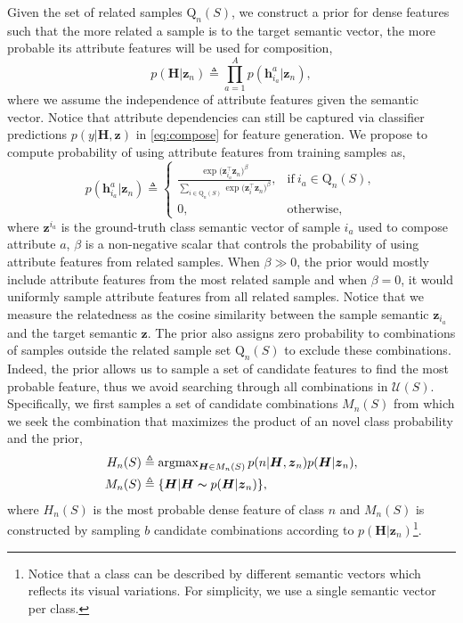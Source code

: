 \documentclass[10pt,journal,compsoc]{IEEEtran}
\newcommand{\z}{\boldsymbol{z}}
\newcommand{\h}{\boldsymbol{h}}
\renewcommand{\H}{\boldsymbol{H}}
\newcommand{\1}{\boldsymbol{1}}
\newcommand{\0}{\boldsymbol{0}}
\newcommand{\U}{\mathcal{U}}
\newcommand{\Q}{\mathrm{Q}}
\newcommand{\argmax}{\operatorname{argmax}}
\newcommand{\<}{\langle}
\renewcommand{\>}{\rangle}
\begin{document}
Given the set of related samples $\Q_{n}(S)$, we construct a prior for dense features such that the more related a sample is to the target semantic vector, the more probable its attribute features will be used for composition,
\begin{equation}
\label{eq:attribute_independence}
p(\H|\z_n) \triangleq \prod_{a=1}^{A} p(\h^a_{i_a}|\z_n),
\end{equation}
where we assume the independence of attribute features given the semantic vector.
Notice that attribute dependencies can still be captured via classifier predictions $p(y|\H,\z)$ in \eqref{eq:compose} for feature generation.
We propose to compute probability of using attribute features from training samples as,
\begin{equation}
p(\h^a_{i_a}|\z_n)\triangleq \begin{cases}
      \frac{\exp\big(\z_{i_a}^\top\z_n \big)^\beta}{\sum_{i\in \Q_{n}(S)}\exp\big(\z_{i}^\top\z_n\big)^\beta }, & \text{if}\ i_a \in \Q_{n}(S), \\
      0, & \text{otherwise,}
    \end{cases}
\end{equation}
where $\z^{i_a}$ is the ground-truth class semantic vector of sample $i_a$ used to compose attribute $a$, $\beta$ is a non-negative scalar that controls the probability of using attribute features from related samples. When $\beta \gg 0$, the prior would mostly include attribute features from the most related sample and  when $\beta=0$, it would uniformly sample attribute features from all related samples. Notice that we measure the relatedness as the cosine similarity between the sample semantic $\z_{i_a}$ and the target semantic $\z$.
The prior also assigns zero probability to combinations of samples outside the related sample set $\Q_{n}(S)$ to exclude these combinations.
Indeed, the prior allows us to sample a set of candidate features to find the most probable feature, thus we avoid searching through all combinations in $\U(S)$. Specifically, we first samples a set of candidate combinations $M_n(S)$ from which we seek the combination that maximizes the product of an novel class probability and the prior, 
\begin{equation}
\begin{split}
H_n(S) &\triangleq \argmax_{\H\in M_n(S)}p(n|\H,\z_n)p(\H|\z_n),\label{eq:novel_compose}\\
M_n(S) &\triangleq \{\H|\H\thicksim p(\H|\z_n)\},
\end{split}
\end{equation}
where $H_n(S)$ is the most probable dense feature of class $n$ and $M_n(S)$ is constructed by sampling $b$ candidate combinations according to $p(\H|\z_n)$\footnote{Notice that a class can be described by different semantic vectors which reflects its visual variations. For simplicity, we use a single semantic vector per class.}.
\end{document}
